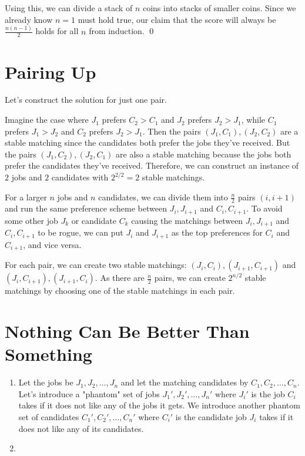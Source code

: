 \documentclass{article}
\begin{document}
Using this, we can divide a stack of $n$ coins into stacks of smaller coins. Since 
we already know $n=1$ must hold true, our claim that the score will always be 
$\frac{n(n-1)}{2}$ holds for all $n$ from induction. \qed

\section{Pairing Up}

Let's construct the solution for just one pair. 

Imagine the case where $J_1$ prefers $C_2 > C_1$ and $J_2$ prefers 
$J_2 > J_1$, while $C_1$ prefers $J_1 > J_2$ and $C_2$ prefers $J_2 > J_1$. 
Then the pairs $(J_1, C_1), (J_2, C_2)$ are a stable matching since the candidates 
both prefer the jobs they've received. But the pairs $(J_1, C_2), (J_2, C_1)$ are 
also a stable matching because the jobs both prefer the candidates they've received. 
Therefore, we can construct an instance of $2$ jobs and $2$ candidates 
with $2^{2/2} = 2$ stable matchings.

For a larger $n$ jobs and $n$ candidates, we can divide them into $\frac{n}{2}$ pairs $(i, i+1)$ 
and run the same preference scheme between $J_i, J_{i+1}$ and $C_i, C_{i+1}$. To avoid 
some other job $J_k$ or candidate $C_k$ causing the matchings between $J_i, J_{i+1}$ and 
$C_i, C_{i+1}$ to be rogue, we can put $J_i$ and $J_{i+1}$ as the top preferences 
for $C_i$ and $C_{i+1}$, and vice versa.

For each pair, we can create two stable matchings: $(J_i, C_i), (J_{i+1}, C_{i+1})$ and 
$(J_i, C_{i+1}), (J_{i+1}, C_i)$. As there are $\frac{n}{2}$ pairs, we can create  
$2^{n/2}$ stable matchings by choosing one of the stable matchings in each pair.


\section{Nothing Can Be Better Than Something}
\begin{enumerate}[label=\alph*.]
	\item Let the jobs be $J_1, J_2, \ldots, J_n$ and let the matching  
		candidates by $C_1, C_2, \ldots, C_n$. Let's introduce a "phantom" 
		set of jobs $J_1', J_2', \ldots, J_n'$ where $J_i'$ is the job 
		$C_i$ takes if it does not like any of the jobs it gets. We 
		introduce another phantom set of candidates $C_1', C_2', \ldots, C_n'$ 
		where $C_i'$ is the candidate job $J_i$ takes if it does not like 
		any of its candidates. 

		
	\item 
\end{enumerate}
\end{document}

